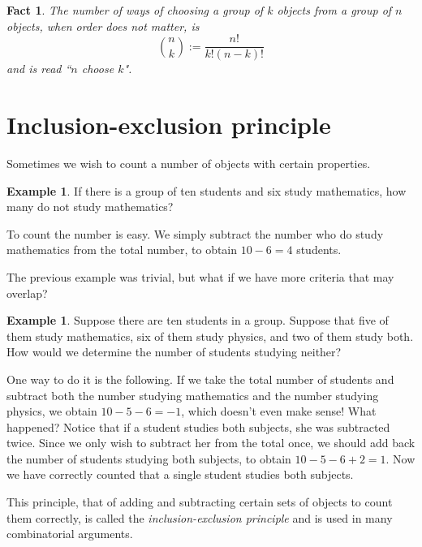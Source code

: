 \documentclass{book}
\theoremstyle{plain}
\newtheorem{fact}[theorem]{Fact}
\theoremstyle{definition}
\newtheorem{example}[theorem]{Example}
\begin{document}
\begin{fact}
The number of ways of choosing a group of $k$ objects from a group of $n$ objects, when order does not matter, is $$\binom{n}{k} := \frac{n!}{k!(n-k)!}$$ and is read ``$n$ choose $k$".
\end{fact}

\section{Inclusion-exclusion principle}
Sometimes we wish to count a number of objects with certain properties.

\begin{example}
If there is a group of ten students and six study mathematics, how many do not study mathematics?

To count the number is easy. We simply subtract the number who do study mathematics from the total number, to obtain $10 - 6 = 4$ students.
\end{example}

The previous example was trivial, but what if we have more criteria that may overlap?

\begin{example}
Suppose there are ten students in a group. Suppose that five of them study mathematics, six of them study physics, and two of them study both. How would we determine the number of students studying neither?

One way to do it is the following. If we take the total number of students and subtract both the number studying mathematics and the number studying physics, we obtain $10 - 5 - 6 = -1$, which doesn't even make sense! What happened? Notice that if a student studies both subjects, she was subtracted twice. Since we only wish to subtract her from the total once, we should add back the number of students studying both subjects, to obtain $10 - 5 - 6 + 2 = 1$. Now we have correctly counted that a single student studies both subjects.
\end{example}

This principle, that of adding and subtracting certain sets of objects to count them correctly, is called the {\it inclusion-exclusion principle} and is used in many combinatorial arguments.
\end{document}
